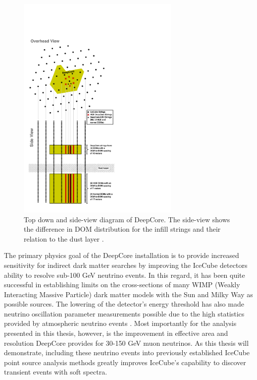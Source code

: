 \documentclass{gatech-thesis}
\begin{document}
\begin{figure}[ht]
  \begin{center}
    \includegraphics[width=0.7\textwidth,keepaspectratio]{IC86EDC_DeepCoreDiagram.pdf}
  \end{center}
  \caption{Top down and side-view diagram of DeepCore. The side-view shows the difference in DOM distribution for the infill strings and their relation to the dust layer \cite{2012APh....35..615A}.}
  \label{fig:DeepCoreSchematic}
\end{figure}

The primary physics goal of the DeepCore installation is to provide increased sensitivity for indirect dark matter searches by improving the IceCube detectors ability to resolve sub-100 GeV neutrino events. In this regard, it has been quite successful in establishing limits on the cross-sections of many WIMP (Weakly Interacting Massive Particle) dark matter models with the Sun \cite{2013PhRvL.110m1302A} and Milky Way \cite{2011PhRvD..84b2004A} as possible sources. The lowering of the detector's energy threshold has also made neutrino oscillation parameter measurements possible due to the high statistics provided by atmospheric neutrino events \cite{2013PhRvL.111h1801A}. Most importantly for the analysis presented in this thesis, however, is the improvement in effective area and resolution DeepCore provides for 30-150 GeV muon neutrinos. As this thesis will demonstrate, including these neutrino events into previously established IceCube point source analysis methods greatly improves IceCube's capability to discover transient events with soft spectra.
\end{document}
